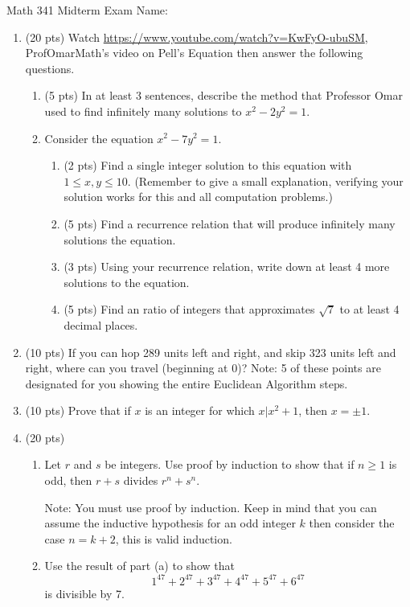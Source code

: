 \documentclass[12pt]{article}
\begin{document}
Math 341 Midterm Exam
\hfill
Name: \underline{\hspace*{2in}}
\begin{enumerate}
	\item (20 pts) Watch \url{https://www.youtube.com/watch?v=KwFyO-ubuSM}, ProfOmarMath's video on Pell's Equation then answer the following questions.
		\begin{enumerate}
			\item (5 pts) In at least 3 sentences, describe the method that Professor Omar used to find infinitely many solutions to $x^2-2y^2=1$.
				\vfill
			\item Consider the equation $x^2-7y^2=1$.  
				\begin{enumerate}
					\item (2 pts) Find a single integer solution to this equation with $1\leq x,y\leq 10$. (Remember to give a small explanation, verifying your solution works for this and all computation problems.)
						\vskip 1in
					\item (5 pts) Find a recurrence relation that will produce infinitely many solutions the equation.
						\vfill
						\newpage
					\item (3 pts) Using your recurrence relation, write down at least 4 more solutions to the equation.
						\vfill
					\item (5 pts) Find an ratio of integers that approximates $\sqrt{7}$ to at least 4 decimal places. 
					\vfill
				\end{enumerate}
		\end{enumerate}
	\newpage
	\item (10 pts) If you can hop 289 units left and right, and skip 323 units left and right, where can you travel (beginning at 0)?  Note: 5 of these points are designated for you showing the entire Euclidean Algorithm steps.
		\vfill
		\newpage
	\item (10 pts) Prove that if $x$ is an integer for which $x|x^2+1$, then $x=\pm 1$.
		\vfill
		\newpage
	\item (20 pts) 
		\begin{enumerate}
			\item Let $r$ and $s$ be integers. Use proof by induction to show that if $n\geq 1$ is odd, then $r+s$ divides $r^n+s^n$.
			
			Note: You must use proof by induction.  Keep in mind that you can assume the inductive hypothesis for an odd integer $k$ then consider the case $n=k+2$, this is valid induction.
				\vfill
				\newpage
			\item Use the result of part (a) to show that 
				\[1^{47}+2^{47}+3^{47}+4^{47}+5^{47}+6^{47}\]
				is divisible by 7.
				

\end{enumerate}
\end{enumerate}
\end{document}

